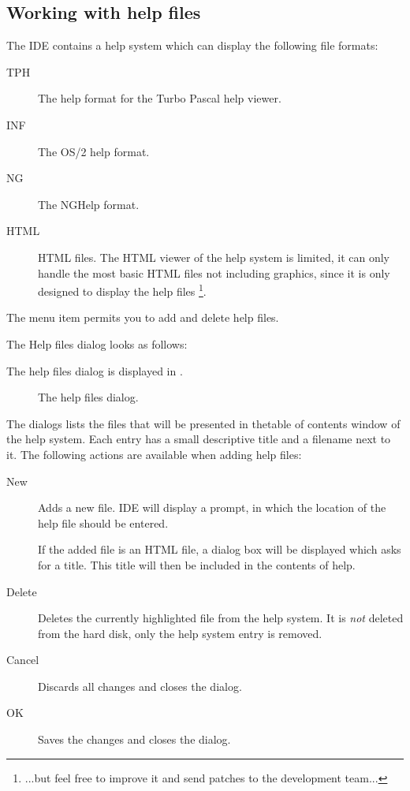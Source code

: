 \subsection{Working with help files}
The IDE contains a help system which can display the following file formats:
\begin{description}
\item[TPH] The help format for the Turbo Pascal help viewer.
\item[INF] The OS/2 help format.
\item[NG] The NGHelp format.
\item[HTML] HTML files. 
The HTML viewer of the  help system is limited, it can only handle the 
most basic HTML files not including graphics, since it is only designed 
to display the \fpc help files \footnote{...but feel free to improve it and send patches to the 
\fpc development team...}.
\end{description}
The menu item  permits you to add and delete
help files.
\begin{htmlonly}
The Help files dialog looks as follows:
\end{htmlonly}
\begin{latexonly}
The help files dialog is displayed in .
\begin{figure}[ht]
\caption{The help files dialog.}\label{fig:helpfiles}
\ifpdf
{}
\else
{}
\fi
\end{figure}
\end{latexonly}
The dialogs lists the files that will be presented in thetable of contents
window of the help system. Each entry has a small descriptive title and a
filename next to it. The following actions are available when adding help
files:
\begin{description}
\item[New] Adds a new file. IDE will display a prompt, in which the 
location of the help file should be entered. 

If the added file is an HTML file, a dialog box will be displayed
which asks for a title. This title will then be included in the
contents of help.
\item[Delete] Deletes the currently highlighted file from the help system.
It is \emph{not} deleted from the hard disk, only the help system entry is
removed.
\item[Cancel] Discards all changes and closes the dialog.
\item[OK] Saves the changes and closes the dialog.
\end{description}


